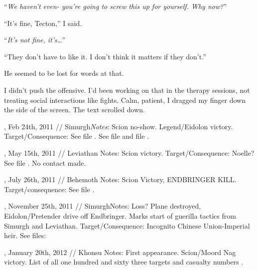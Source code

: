 ``\emph{We haven't even- you're going to screw this up for yourself.  Why now?}''



``It's fine, Tecton,'' I said.



``\emph{It's not fine, it's\ldots}''



``They don't have to like it.  I don't think it matters if they don't.''



He seemed to be lost for words at that.



I didn't push the offensive.  I'd been working on that in the therapy sessions, not treating social interactions like fights.  Calm, patient, I dragged my finger down the side of the screen.  The text scrolled down.



, Feb 24th, 2011 // Simurgh\emph{Notes}:  Scion no-show.  Legend/Eidolon victory.
Target/Consequence: See file \underline{}\underline{}.  See file \underline{} and file \underline{}.



, May 15th, 2011 // Leviathan
Notes:  Scion victory.
Target/Consequence: Noelle?  See file \underline{}.  No contact made.



, July 26th, 2011 // Behemoth
Notes: Scion Victory, ENDBRINGER KILL.
Target/consequence: See file \underline{}.



, November 25th, 2011 // SimurghNotes: Loss?  Plane destroyed, Eidolon/Pretender drive off Endbringer.  Marks start of guerilla tactics from Simurgh and Leviathan.
Target/Consequence: Incognito Chinese Union-Imperial heir.  See files:\underline{}\underline{}\underline{}\underline{}



, January 20th, 2012 // Khonsu
Notes: First appearance.  Scion/Moord Nag victory.  List of all one hundred and sixty three targets and casualty numbers \underline{}.



